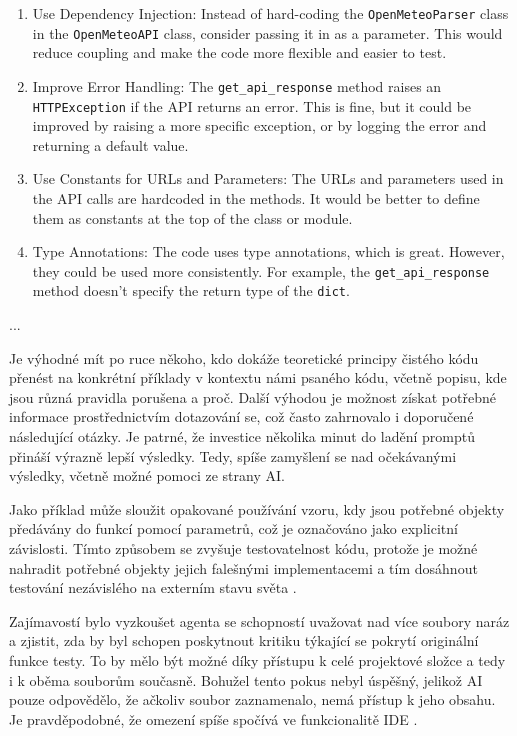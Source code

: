 \documentclass[FM,DP]{tulthesis}
\begin{document}
\begin{tcolorbox}[colback=white,colframe=black]
\begin{enumerate}
				\item Use Dependency Injection: Instead of hard-coding the \verb|OpenMeteoParser| class in the \verb|OpenMeteoAPI| class, consider passing it in as a parameter. This would reduce coupling and make the code more flexible and easier to test.
				
				\item Improve Error Handling: The \verb|get_api_response| method raises an \verb|HTTPException| if the API returns an error. This is fine, but it could be improved by raising a more specific exception, or by logging the error and returning a default value.
				
				\item Use Constants for URLs and Parameters: The URLs and parameters used in the API calls are hardcoded in the methods. It would be better to define them as constants at the top of the class or module.
				
				\item Type Annotations: The code uses type annotations, which is great. However, they could be used more consistently. For example, the \verb|get_api_response| method doesn't specify the return type of the \verb|dict|.
			\end{enumerate}
			... \cite{call_api}
		\end{tcolorbox}
		
		Je výhodné mít po ruce někoho, kdo dokáže teoretické principy čistého kódu přenést na konkrétní příklady v kontextu námi psaného kódu, včetně popisu, kde jsou různá pravidla porušena a proč. Další výhodou je možnost získat potřebné informace prostřednictvím dotazování se, což často zahrnovalo i doporučené následující otázky. Je patrné, že investice několika minut do ladění promptů přináší výrazně lepší výsledky. Tedy, spíše zamyšlení se nad očekávanými výsledky, včetně možné pomoci ze strany AI. 
		
		Jako příklad může sloužit opakované používání vzoru, kdy jsou potřebné objekty předávány do funkcí pomocí parametrů, což je označováno jako explicitní závislosti. Tímto způsobem se zvyšuje testovatelnost kódu, protože je možné nahradit potřebné objekty jejich falešnými implementacemi a tím dosáhnout testování nezávislého na externím stavu světa \cite{msft:dependency}.
		
		Zajímavostí bylo vyzkoušet agenta se schopností uvažovat nad více soubory naráz a zjistit, zda by byl schopen poskytnout kritiku týkající se pokrytí originální funkce testy. To by mělo být možné díky přístupu k celé projektové složce a tedy i k oběma souborům současně. Bohužel tento pokus nebyl úspěšný, jelikož AI pouze odpovědělo, že ačkoliv soubor zaznamenalo, nemá přístup k jeho obsahu. Je pravděpodobné, že omezení spíše spočívá ve funkcionalitě IDE \cite{agent_coverage}.
		
\end{document}
